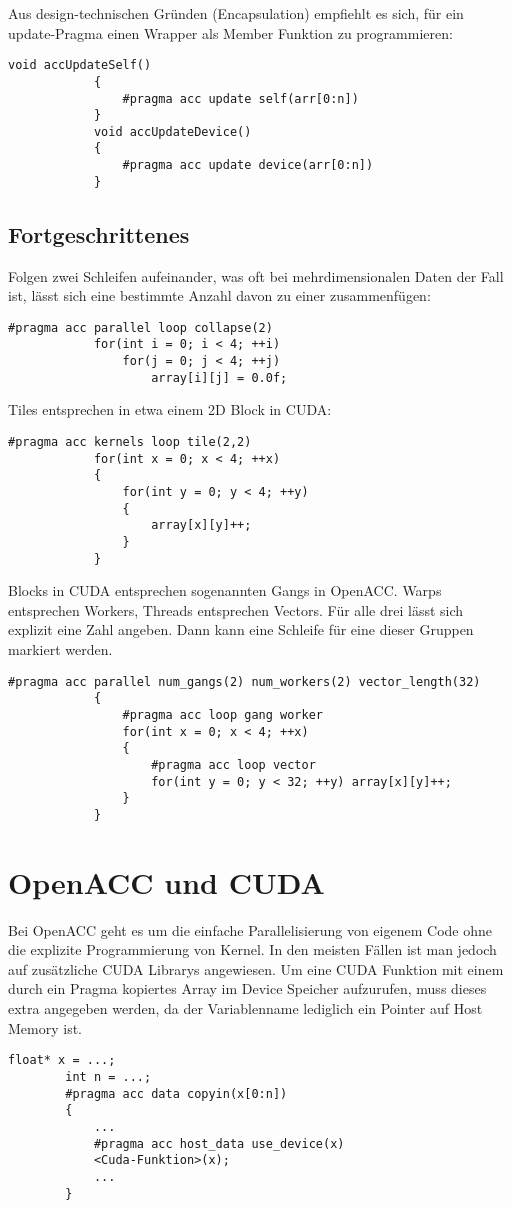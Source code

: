 			Aus design-technischen Gründen (Encapsulation) empfiehlt es sich, für ein update-Pragma einen Wrapper als Member Funktion zu programmieren:
			\begin{lstlisting}[caption=OpenACC: Update Member-Funktion]
			void accUpdateSelf() 
			{
				#pragma acc update self(arr[0:n])
			}
			void accUpdateDevice() 
			{
				#pragma acc update device(arr[0:n])
			}			
			\end{lstlisting}

			\newpage
			\subsection{Fortgeschrittenes}
			Folgen zwei Schleifen aufeinander, was oft bei mehrdimensionalen Daten der Fall ist, lässt sich eine bestimmte Anzahl davon zu einer zusammenfügen:
			\begin{lstlisting}[caption=OpenACC: Loop Collapse]
			#pragma acc parallel loop collapse(2)
			for(int i = 0; i < 4; ++i) 
				for(j = 0; j < 4; ++j)
					array[i][j] = 0.0f;
			\end{lstlisting}
			
			Tiles entsprechen in etwa einem 2D \Gls{Block} in CUDA:
			\begin{lstlisting}[caption=OpenACC: Tile]
			#pragma acc kernels loop tile(2,2)
			for(int x = 0; x < 4; ++x)
			{
				for(int y = 0; y < 4; ++y)
				{
					array[x][y]++;
				}
			}
			\end{lstlisting}
			
			\Glspl{Block} in CUDA entsprechen sogenannten \Glspl{Gang} in OpenACC. \Glspl{Warp} entsprechen \Glspl{Worker}, \Glspl{Thread} entsprechen \Glspl{Vector}. Für alle drei lässt sich explizit eine Zahl angeben. Dann kann eine Schleife für eine dieser Gruppen markiert werden.
			\begin{lstlisting}[caption=OpenACC: Gangs Workers Vectors]
			#pragma acc parallel num_gangs(2) num_workers(2) vector_length(32)
			{
				#pragma acc loop gang worker
				for(int x = 0; x < 4; ++x)
				{
					#pragma acc loop vector
					for(int y = 0; y < 32; ++y) array[x][y]++;
				}
			}			
			\end{lstlisting}
			
		\section{OpenACC und CUDA}
		Bei OpenACC geht es um die einfache Parallelisierung von eigenem Code ohne die explizite Programmierung von \Gls{Kernel}. In den meisten Fällen ist man jedoch auf zusätzliche CUDA Librarys angewiesen. Um eine CUDA Funktion mit einem durch ein Pragma kopiertes Array im Device Speicher aufzurufen, muss dieses extra angegeben werden, da der Variablenname lediglich ein Pointer auf Host Memory ist.
		\begin{lstlisting}[caption=OpenACC/CUDA Zusammenspiel: Host Memory]
		float* x = ...;
		int n = ...;
		#pragma acc data copyin(x[0:n])
		{
			...
			#pragma acc host_data use_device(x)
			<Cuda-Funktion>(x);
			...
		}
		\end{lstlisting}

